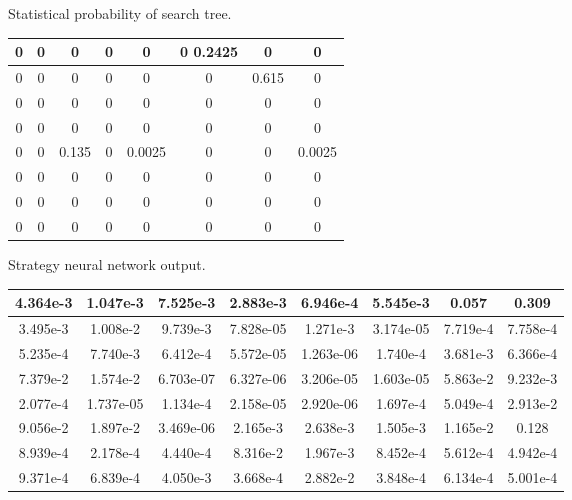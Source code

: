 \begin{table}[htbp]
	\centering
	{Statistical probability of search tree.}
	\label{tab:moxinggailv3}
\begin{tabular}{|c|c|c|c|c|c|c|c|}
	\hline 
	0& 0 & 0 &0  & 0 &0 0.2425 & 0 &0  \\ 
	\hline 
	0 & 0 & 0 & 0 & 0 & 0 & 0.615 & 0 \\ 
	\hline 
	0 & 0 & 0 & 0 & 0 & 0 & 0 & 0 \\ 
	\hline 
	0 & 0 & 0 & 0 & 0& 0 & 0 & 0 \\ 
	\hline 
	0 & 0 & 0.135 & 0 & 0.0025 & 0 & 0 & 0.0025 \\ 
	\hline 
	0 & 0 & 0 & 0 & 0 & 0 & 0 & 0 \\ 
	\hline 
	0 & 0 & 0 & 0 & 0 & 0 & 0 & 0 \\ 
	\hline 
	0 & 0 & 0 & 0 & 0 & 0 & 0 & 0 \\ 
	\hline 
\end{tabular}
\end{table}




\begin{table}[htbp]
	\centering
	{Strategy neural network output.}
	\label{tab:celueshenjingwangluoshuchu}
	\begin{tabular}{|c|c|c|c|c|c|c|c|}
		\hline 
		4.364e-3 & 1.047e-3 & 7.525e-3 & 2.883e-3 & 6.946e-4 & 5.545e-3 & 0.057 & 0.309 \\ 
		\hline 
		3.495e-3 & 1.008e-2 & 9.739e-3 & 7.828e-05 & 1.271e-3 & 3.174e-05 & 7.719e-4 & 7.758e-4 \\ 
		\hline 
		5.235e-4 & 7.740e-3 & 6.412e-4 & 5.572e-05 & 1.263e-06 & 1.740e-4 & 3.681e-3 & 6.366e-4 \\ 
		\hline 
		7.379e-2 & 1.574e-2 & 6.703e-07 & 6.327e-06 & 3.206e-05 & 1.603e-05 & 5.863e-2 & 9.232e-3 \\ 
		\hline 
		2.077e-4 & 1.737e-05 & 1.134e-4 & 2.158e-05 & 2.920e-06 & 1.697e-4 & 5.049e-4 & 2.913e-2 \\ 
		\hline 
		9.056e-2 & 1.897e-2 & 3.469e-06 & 2.165e-3 & 2.638e-3 & 1.505e-3 & 1.165e-2 & 0.128 \\ 
		\hline 
		8.939e-4 & 2.178e-4 & 4.440e-4 & 8.316e-2 & 1.967e-3 & 8.452e-4 & 5.612e-4 & 4.942e-4 \\ 
		\hline 
		9.371e-4 & 6.839e-4 & 4.050e-3 & 3.668e-4 & 2.882e-2 & 3.848e-4 & 6.134e-4 &5.001e-4 \\ 
		\hline 
	\end{tabular} 
\end{table}

